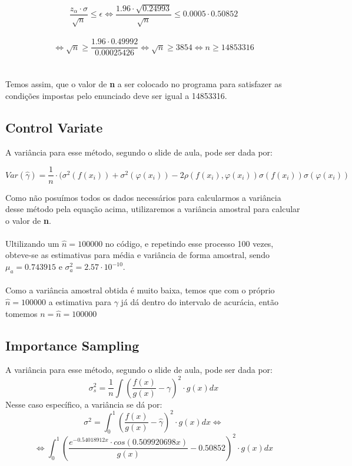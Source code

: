 \documentclass{article}
\begin{document}
    $$\frac{z_\alpha \cdot \sigma}{\sqrt{n}} \leq \epsilon \Leftrightarrow \frac{1.96 \cdot\sqrt{0.24993}}{\sqrt{n}} \leq 0.0005\cdot 0.50852$$\\
    
    $$\Leftrightarrow \sqrt{n}\geq \frac{1.96\cdot 0.49992}{0.00025426}\Leftrightarrow \sqrt{n}\geq 3854 \Leftrightarrow n\geq 14853316$$\\
    \\
    Temos assim, que o valor de \textbf{n} a ser colocado no programa para satisfazer as condições impostas pelo enunciado deve ser igual a 14853316.

\subsection{Control Variate}

A variância para esse método, segundo o slide de aula, pode ser dada por:

$$Var(\hat{\gamma}) = \frac{1}{n} \cdot (\sigma^2(f(x_i)) + \sigma^2(\varphi(x_i))-2\rho(f(x_i),\varphi(x_i))\sigma(f(x_i))\sigma(\varphi(x_i))$$

Como não posuímos todos os dados necessários para calcularmos a variância desse método pela equação acima, utilizaremos a variância amostral para calcular o valor de \textbf{n}.\\
\\
Ultilizando um $\hat{n} = 100000$ no código, e repetindo esse processo 100 vezes, obteve-se as estimativas para média e variância de forma amostral, sendo $\mu_a = 0.743915$ e $\sigma^2_a = 2.57\cdot 10^{-10} $.\\
\\
Como a variância amostral obtida é muito baixa, temos que com o próprio $\hat{n} = 100000$ a estimativa para $\gamma$ já dá dentro do intervalo de acurácia, então tomemos $n = \hat{n} = 100000$

\subsection{Importance Sampling}

A variância para esse método, segundo o slide de aula, pode ser dada por:
$$ \sigma^2_s = \frac{1}{n} \int (\frac{f(x)}{g(x)} - \gamma)^2 \cdot g(x) dx $$
Nesse caso específico, a variância se dá por:
$$ \sigma^2 = \int_{0}^{1} (\frac{f(x)}{g(x)} - \hat{\gamma})^2 \cdot g(x) dx \Leftrightarrow $$
$$\Leftrightarrow \int_{0}^{1} (\frac{e^{-0.54018912x}\cdot cos(0.509920698x)}{g(x)}-0.50852)^2\cdot g(x) dx$$
\end{document}
